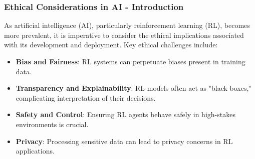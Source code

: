 \documentclass[aspectratio=169]{beamer}
\begin{document}
\begin{frame}[fragile]
    \frametitle{Ethical Considerations in AI - Introduction}
    As artificial intelligence (AI), particularly reinforcement learning (RL), becomes more prevalent, it is imperative to consider the ethical implications associated with its development and deployment. Key ethical challenges include:
    \begin{itemize}
        \item \textbf{Bias and Fairness}: RL systems can perpetuate biases present in training data.
        \item \textbf{Transparency and Explainability}: RL models often act as "black boxes," complicating interpretation of their decisions.
        \item \textbf{Safety and Control}: Ensuring RL agents behave safely in high-stakes environments is crucial.
        \item \textbf{Privacy}: Processing sensitive data can lead to privacy concerns in RL applications.
    \end{itemize}
\end{frame}
\end{document}
